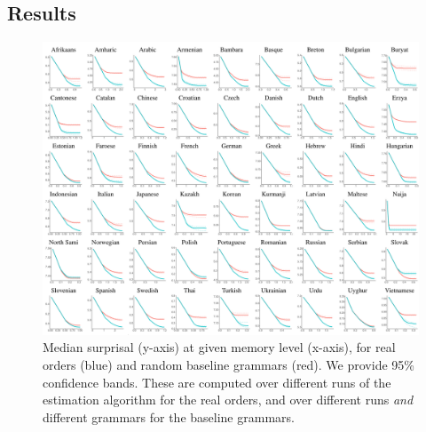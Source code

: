 



\subsection{Results}



\begin{figure}
	\begin{center}
\includegraphics[width=\textwidth]{results-table.pdf}
\end{center}
	\caption{Median surprisal (y-axis) at given memory level (x-axis), for real orders (blue) and random baseline grammars (red). We provide 95\% confidence bands. These are computed over different runs of the estimation algorithm for the real orders, and over different runs \emph{and} different grammars for the baseline grammars.}\label{fig:median-table}
\end{figure}



